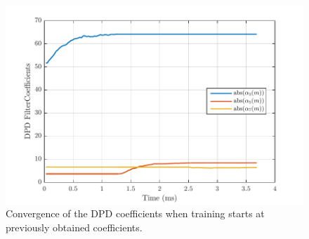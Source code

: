 \begin{figure}[t!] 
\centering
\includegraphics[width=0.9\columnwidth]{Figures/UseOldCoeff_IncreasePower_Convergence}
\caption{Convergence of the DPD coefficients when training starts at previously obtained coefficients.}
\label{fig:UseOldCoeff_IncreasePower_Convergence}
\vspace{-10pt}
\end{figure}






